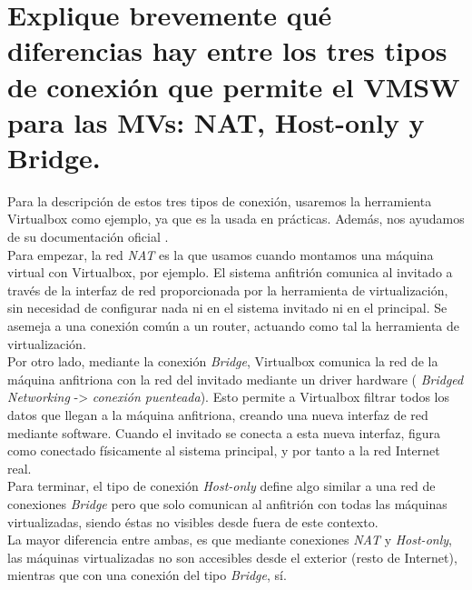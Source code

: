 \section{Explique brevemente qué diferencias hay entre los tres tipos de conexión que permite el VMSW para las MVs: NAT,
Host-only y Bridge.}

Para la descripción de estos tres tipos de conexión, usaremos la herramienta Virtualbox como ejemplo, ya que es la usada en prácticas. Además, nos ayudamos de su
documentación oficial \cite{virtualbox-networks}. \\

Para empezar, la red \emph{NAT} es la que usamos cuando montamos una máquina virtual con Virtualbox, por ejemplo. El sistema anfitrión comunica al invitado a través
de la interfaz de red proporcionada por la herramienta de virtualización, sin necesidad de configurar nada ni en el sistema invitado ni en el principal. Se asemeja
a una conexión común a un router, actuando como tal la herramienta de virtualización. \\

Por otro lado, mediante la conexión \emph{Bridge}, Virtualbox comunica la red de la máquina anfitriona con la red del invitado mediante un driver hardware (\emph{
Bridged Networking} -> \emph{conexión puenteada}). Esto permite a Virtualbox filtrar todos los datos que llegan a la máquina anfitriona, creando una nueva interfaz de
red mediante software. Cuando el invitado se conecta a esta nueva interfaz, figura como conectado físicamente al sistema principal, y por tanto a la red Internet real. \\

Para terminar, el tipo de conexión \emph{Host-only} define algo similar a una red de conexiones \emph{Bridge} pero que solo comunican al anfitrión con todas las
máquinas virtualizadas, siendo éstas no visibles desde fuera de este contexto. \\

La mayor diferencia entre ambas, es que mediante conexiones \emph{NAT} y \emph{Host-only}, las máquinas virtualizadas no son accesibles desde el 
exterior (resto de Internet), mientras que con una conexión del tipo \emph{Bridge}, sí.





